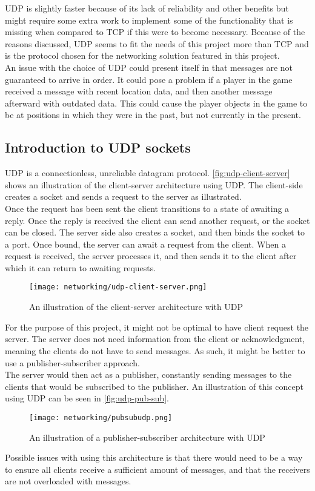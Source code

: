 UDP is slightly faster because of its lack of reliability and other benefits but might require some extra work to implement some of the functionality that is missing when compared to TCP if this were to become necessary.
Because of the reasons discussed, UDP seems to fit the needs of this project more than TCP and is the protocol chosen for the networking solution featured in this project.\\
An issue with the choice of UDP could present itself in that messages are not guaranteed to arrive in order.
It could pose a problem if a player in the game received a message with recent location data, and then another message afterward with outdated data.
This could cause the player objects in the game to be at positions in which they were in the past, but not currently in the present.

\subsection{Introduction to UDP sockets}
UDP is a connectionless, unreliable datagram protocol.
\autoref{fig:udp-client-server} shows an illustration of the client-server architecture using UDP.
The client-side creates a socket and sends a request to the server as illustrated.\\
Once the request has been sent the client transitions to a state of awaiting a reply.
Once the reply is received the client can send another request, or the socket can be closed.
The server side also creates a socket, and then binds the socket to a port.
Once bound, the server can await a request from the client.
When a request is received, the server processes it, and then sends it to the client after which it can return to awaiting requests.
\begin{figure}[H]
    \centering
    \texttt{[image: networking/udp-client-server.png]}
    \caption{An illustration of the client-server architecture with UDP}
    \label{fig:udp-client-server}
\end{figure}
\noindent
For the purpose of this project, it might not be optimal to have client request the server.
The server does not need information from the client or acknowledgment, meaning the clients do not have to send messages.
As such, it might be better to use a publisher-subscriber approach.\\
The server would then act as a publisher, constantly sending messages to the clients that would be subscribed to the publisher.
An illustration of this concept using UDP can be seen in \autoref{fig:udp-pub-sub}.
\begin{figure}[H]
    \centering
    \texttt{[image: networking/pubsubudp.png]}
    \caption{An illustration of a publisher-subscriber architecture with UDP}
    \label{fig:udp-pub-sub}
\end{figure}
\noindent
Possible issues with using this architecture is that there would need to be a way to ensure all clients receive a sufficient amount of messages, and that the receivers are not overloaded with messages.

